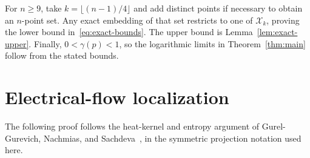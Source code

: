 \documentclass[11pt]{article}
\theoremstyle{remark}
\numberwithin{equation}{section}
\begin{document}
For $n\ge9$, take $k=\lfloor(n-1)/4\rfloor$ and add distinct points
if necessary to obtain an $n$-point set. Any exact embedding of that
set restricts to one of $\mathcal X_k$, proving the lower bound
in~\eqref{eq:exact-bounds}. The upper bound is
Lemma~\ref{lem:exact-upper}. Finally, $0<\gamma(p)<1$, so the
logarithmic limits in Theorem~\ref{thm:main} follow from the stated
bounds.


\appendix
\section{Electrical-flow localization}\label{app:localization}

The following proof follows the heat-kernel and entropy argument of
Gurel-Gurevich, Nachmias, and Sachdeva~\cite[Sections~2--4]{GGNS},
in the symmetric projection notation used here.
\end{document}
